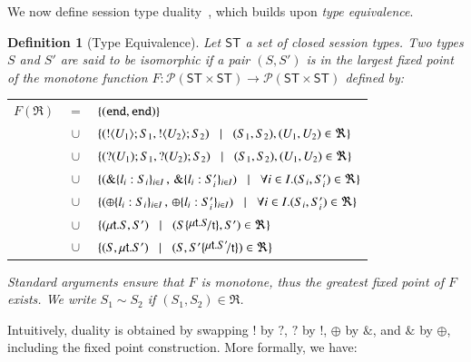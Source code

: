 \documentclass[preprint,11pt]{elsarticle}
\newtheorem{definition}{Definition}[section]
\begin{document}
{We now  define session type duality~\cite{TGC14}, which builds upon \emph{type equivalence}.

\begin{definition}[Type Equivalence]
\label{def:iso}
Let $\mathsf{ST}$ a set of closed session types. 
Two types $S$ and $S'$ are said to be {\em isomorphic} if a pair $(S,S')$ is 
in the largest fixed point of the monotone function
$F:\mathcal{P}(\mathsf{ST}\times \mathsf{ST}) \to 
\mathcal{P}(\mathsf{ST}\times \mathsf{ST})$ defined by:

\hspace{-0.5cm}\begin{tabular}{rcl}
$F(\Re)$ &$\!\!=\!\!$&	$\{(\mathtt{end}, \mathtt{end})\}$\\
         &$\!\!\cup\!\!$&	$\{(! \langle U_1 \rangle ; S_1, ! \langle U_2 \rangle ; S_2)
\;\;\;|\;\;\; (S_1, S_2),(U_1, U_2)\in \Re\}$\\ 
       &$\!\!\cup\!\!$&	$\{(? (U_1) ; S_1, ? (U_2) ; S_2)
\;\;\;|\;\;\;(S_1, S_2),(U_1, U_2)\in \Re\}$\\ 
	&$\!\!\cup\!\!$&	$\{(\& \{l_i: S_i\}_{i \in I} \,,\, \& \{l_i: S_i'\}_{i \in I}) \;\;\;|\;\;\; \forall i\in I. (S_i, S_i')\in \Re\}$\\
	&$\!\!\cup\!\!$&	$\{(\oplus \{l_i: S_i\}_{i \in I}\,,\, \oplus \{l_i: S_i'\}_{i \in I}) \;\;\;|\;\;\; \forall i\in I. (S_i, S_i')\in \Re\}$\\
	&$\!\!\cup\!\!$&	$\set{(\trec{t}{S}, S')
\bnfbar (S\subst{\trec{t}{S}}{\vart{t}},S')\in \Re}$\\
	&$\!\!\cup\!\!$&	$\set{(S,\trec{t}{S'})
\bnfbar (S,S'\subst{\trec{t}{S'}}{\vart{t}})\in \Re}$
\end{tabular}
	
\noindent
Standard arguments ensure that $F$ is monotone, thus the greatest fixed point
of $F$ exists. We write $S_1 \sim S_2$ if  $(S_1,S_2)\in \Re$. 
\end{definition}


Intuitively, duality is  obtained by 
swapping $!$ by $?$, $?$ by $!$, $\oplus$ by $\&$, and $\&$ by $\oplus$,  
including the fixed point construction.
More formally, we have:


}
\end{document}
